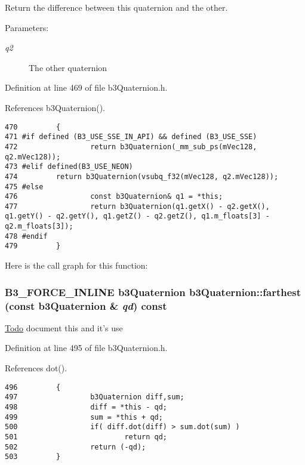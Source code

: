 Return the difference between this quaternion and the other. 

\begin{Desc}
\item[Parameters:]
\begin{description}
\item[{\em q2}]The other quaternion \end{description}
\end{Desc}


Definition at line 469 of file b3Quaternion.h.

References b3Quaternion().

\begin{Code}\begin{verbatim}470         {
471 #if defined (B3_USE_SSE_IN_API) && defined (B3_USE_SSE)
472                 return b3Quaternion(_mm_sub_ps(mVec128, q2.mVec128));
473 #elif defined(B3_USE_NEON)
474         return b3Quaternion(vsubq_f32(mVec128, q2.mVec128));
475 #else   
476                 const b3Quaternion& q1 = *this;
477                 return b3Quaternion(q1.getX() - q2.getX(), q1.getY() - q2.getY(), q1.getZ() - q2.getZ(), q1.m_floats[3] - q2.m_floats[3]);
478 #endif
479         }
\end{verbatim}
\end{Code}




Here is the call graph for this function:\hypertarget{classb3_quaternion_388e68921f4749a5641df37449076db0}{
\subsubsection[farthest]{\setlength{\rightskip}{0pt plus 5cm}B3\_\-FORCE\_\-INLINE {\bf b3Quaternion} b3Quaternion::farthest (const {\bf b3Quaternion} \& {\em qd}) const}}
\label{classb3_quaternion_388e68921f4749a5641df37449076db0}


\begin{Desc}
\item[\hyperlink{todo__todo000002}{Todo}]document this and it's use \end{Desc}


Definition at line 495 of file b3Quaternion.h.

References dot().

\begin{Code}\begin{verbatim}496         {
497                 b3Quaternion diff,sum;
498                 diff = *this - qd;
499                 sum = *this + qd;
500                 if( diff.dot(diff) > sum.dot(sum) )
501                         return qd;
502                 return (-qd);
503         }
\end{verbatim}
\end{Code}




